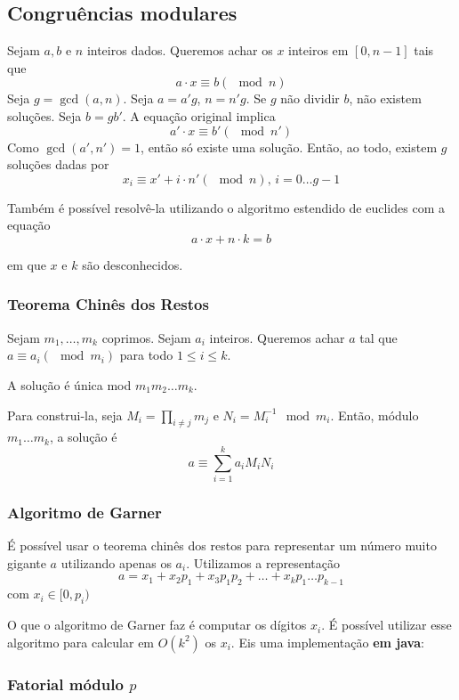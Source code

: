 \subsection{Congruências modulares}

Sejam $a, b$ e $n$ inteiros dados. Queremos achar os $x$ inteiros em $[0, n-1]$ tais que
$$ a \cdot x \equiv b ( \mod n)$$
Seja $g = \gcd(a, n)$. Seja $a=a'g$, $n=n'g$. Se $g$ não dividir $b$, não existem soluções. Seja $b=gb'$. A equação original implica
$$a' \cdot x \equiv b' (\mod n')$$
Como $\gcd(a', n') = 1$, então só existe uma solução. Então, ao todo, existem $g$ soluções dadas por
$$x_i \equiv x' + i \cdot n' ( \mod n), \, i = 0 \dots g-1$$

Também é possível resolvê-la utilizando o algoritmo estendido de euclides com a equação
$$a \cdot x + n \cdot k = b$$

em que $x$ e $k$ são desconhecidos.

\subsubsection{Teorema Chinês dos Restos}

Sejam $m_1, \dots, m_k$ coprimos. Sejam $a_i$ inteiros. Queremos achar $a$ tal que $a \equiv a_i (\mod m_i)$ para todo $1 \leq i \leq k$. 

A solução é única mod $m_1 m_2 \dots m_k$.

Para construi-la, seja $M_i = \prod_{i \neq j} m_j$ e $N_i = M_i^{-1} \mod m_i$. Então, módulo $m_1 \dots m_k$, a solução é $$a \equiv \sum\limits_{i=1}^k a_i M_i N_i$$


\subsubsection{Algoritmo de Garner}

É possível usar o teorema chinês dos restos para representar um número muito gigante $a$ utilizando apenas os $a_i$. Utilizamos a representação
$$a = x_1 + x_2 p_1 + x_3 p_1 p_2 + \dots + x_k p_1 \dots p_{k-1}$$
com $x_i \in [0, p_i)$

O que o algoritmo de Garner faz é computar os dígitos $x_i$. É possível utilizar esse algoritmo para calcular em $O(k^2)$ os $x_i$. Eis uma implementação \textbf{em java}:


\subsubsection{Fatorial módulo $p$}

